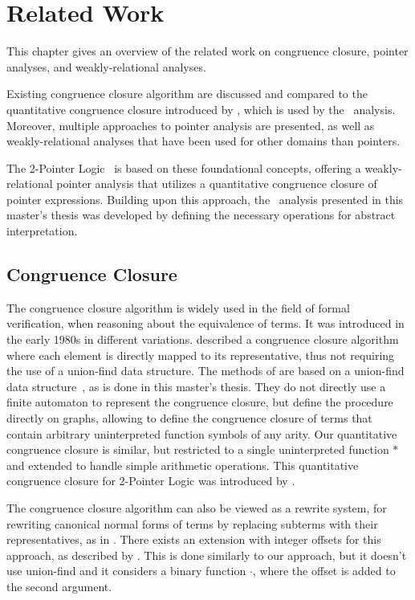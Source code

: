 \chapter{Related Work}\label{chapter:related-work}

This chapter gives an overview of the related work on congruence closure, pointer analyses, and weakly-relational analyses.

Existing congruence closure algorithm are discussed and compared to the quantitative congruence closure introduced by \textcite{2pointer},
which is used by the \cpo\ analysis.
Moreover, multiple approaches to pointer analysis are presented, as well as weakly-relational analyses that have been used for other domains than pointers.

The 2-Pointer Logic~\cite{2pointer} is based on these foundational concepts, offering a weakly-relational pointer analysis that utilizes a quantitative congruence closure of pointer expressions.
Building upon this approach, the \cpo\ analysis presented in this master's thesis was developed by defining the necessary operations for abstract interpretation.

\section{Congruence Closure}

The congruence closure algorithm is widely used in the field of formal verification,
when reasoning about the equivalence of terms. It was introduced in the early 1980s
in different variations. \textcite{cc-tarjan} described a congruence closure algorithm
where each element is directly mapped to its representative, thus not requiring the
use of a union-find data structure.
The methods of \textcite{cc-nelson,cc-shostak} are based on a union-find data structure~\cite{uf-tarjan}, as
is done in this master's thesis. They do not directly use a finite automaton to represent
the congruence closure, but define the procedure directly on graphs,
allowing to define the congruence closure of terms that contain arbitrary uninterpreted function symbols
of any arity.
Our quantitative congruence closure is similar, but restricted to a single uninterpreted function $*$
and extended to handle simple arithmetic operations.
This quantitative congruence closure for 2-Pointer Logic was introduced by \textcite{2pointer}.

The congruence closure algorithm can also be viewed as a rewrite system,
for rewriting canonical normal forms of terms by replacing subterms with their representatives,
as in \cite{cc-kapur,abstract-cc}.
There exists an extension with integer offsets for this approach, as described by \textcite{cc-offsets}.
This is done similarly to our approach, but it doesn't use union-find and it considers a
binary function $\cdot$, where the offset is added to the second argument.

